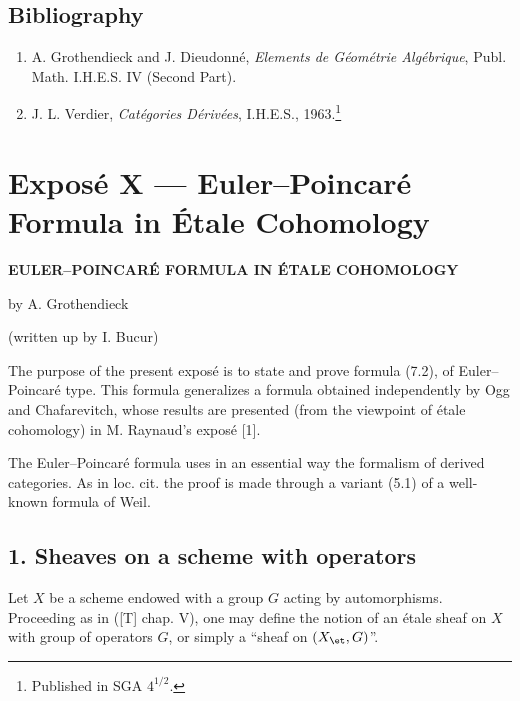 \subsection*{Bibliography}

\begin{enumerate}
\item[{[1]}] A. Grothendieck and J. Dieudonné, \emph{Elements de Géométrie Algébrique}, Publ. Math. I.H.E.S. IV (Second Part).
\item[{[2]}] J. L. Verdier, \emph{Catégories Dérivées}, I.H.E.S., 1963.\footnote{Published in SGA $4^{1/2}$.}
\end{enumerate}

\section*{Exposé X --- Euler--Poincaré Formula in Étale Cohomology}

\begin{center}
\textbf{EULER--POINCARÉ FORMULA IN ÉTALE COHOMOLOGY}

by A. Grothendieck

(written up by I. Bucur)
\end{center}

The purpose of the present exposé is to state and prove formula (7.2), of Euler--Poincaré type. This formula generalizes a formula obtained independently by Ogg and Chafarevitch, whose results are presented (from the viewpoint of étale cohomology) in M. Raynaud's exposé [1].

The Euler--Poincaré formula uses in an essential way the formalism of derived categories. As in loc. cit. the proof is made through a variant (5.1) of a well-known formula of Weil.

\subsection*{1. Sheaves on a scheme with operators}

Let $X$ be a scheme endowed with a group $G$ acting by automorphisms. Proceeding as in ([T] chap. V), one may define the notion of an étale sheaf on $X$ with group of operators $G$, or simply a “sheaf on $(X_{\et},G)$”.


